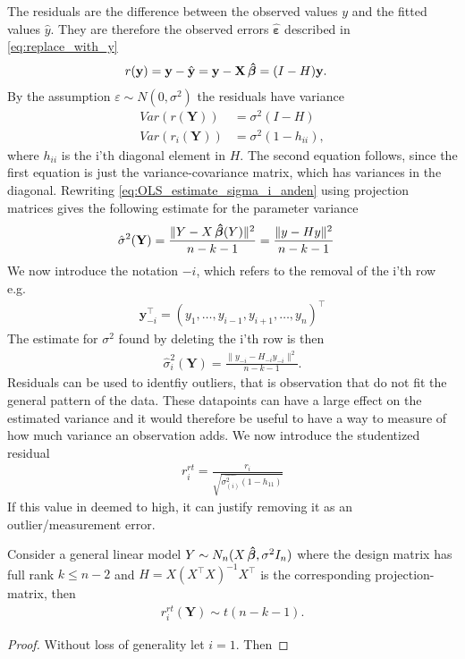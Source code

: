 The residuals are the difference between the observed values $y$ and the fitted values $\hat{y}$. They are therefore the observed errors $\boldsymbol{\hat{\varepsilon}}$ described in \eqref{eq:replace_with_y}
\begin{align*}
    r(\textbf{y}) &= \textbf{y} - \hat{\textbf{y}} = \textbf{y} - \textbf{X} \operatorname{\boldsymbol{\hat{\beta}}} = (I - H) \textbf{y}.
\end{align*}
By the assumption $\varepsilon \sim N(0, \sigma^2)$ the residuals have variance
\begin{align*}
    Var(r(\textbf{Y})) &= \sigma^2 (I - H) \\
    Var(r_i(\textbf{Y})) &= \sigma^2(1 - h_{ii}),
\end{align*}
where $h_{ii}$ is the i'th diagonal element in $H$. The second equation follows, since the first equation is just the variance-covariance matrix, which has variances in the diagonal.
Rewriting \eqref{eq:OLS_estimate_sigma_i_anden} using projection matrices gives the following estimate for the parameter variance
\begin{align*}
    \hat{\sigma}^2(\textbf{Y}) &= \frac{\| Y - X \operatorname{\boldsymbol{\hat{\beta}}} (Y) \|^2 }{n-k-1} = \frac{\| y - H y \|^2}{n-k-1} 
\end{align*}
We now introduce the notation $-i$, which refers to the removal of the i'th row e.g.
\begin{align*}
    \textbf{y}_{-i}^\top = (y_1, \ldots, y_{i-1}, y_{i+1}, \ldots, y_n)^\top
\end{align*}
The estimate for $\sigma^2$ found by deleting the i'th row is then
\begin{align*}
    \hat{\sigma}^2_i(\textbf{Y}) = \frac{\| y_{-i} - H_{-i} y_{-i} \|^2}{n-k-1}.
\end{align*}
Residuals can be used to identfiy outliers, that is observation that do not fit the general pattern of the data. These datapoints can have a large effect on the estimated variance and it would therefore be useful to have a way to measure of how much variance an observation adds. We now introduce the studentized residual
\begin{align*}
    r_i^{rt} = \frac{r_i}{\sqrt{\hat{\sigma^2_{(i)}}(1-h_{11})}}
\end{align*}
If this value in deemed to high, it can justify removing it as an outlier/measurement error. 

\begin{proposition}
    Consider a general linear model $Y \sim N_n(X \operatorname{\boldsymbol{\hat{\beta}}}, \sigma^2 I_n)$ where the design matrix has full rank $k \leq n-2$ and $H = X (X^\top X)^{-1}X^\top$ is the corresponding projection-matrix, then
    \begin{align*}
        r_i^{rt}(\textbf{Y}) \sim t(n-k-1).
    \end{align*}
\end{proposition}
\begin{proof}
    Without loss of generality let $i=1$. Then 
\end{proof}

